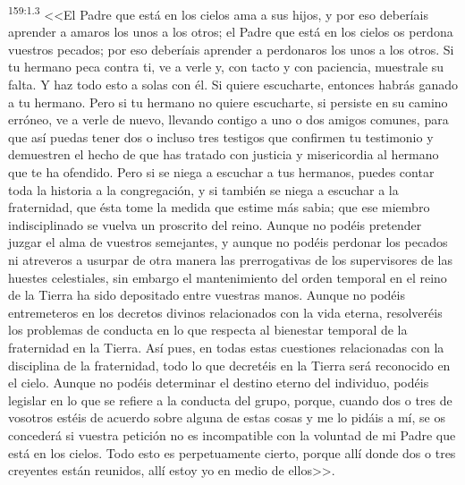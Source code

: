 \par 
\textsuperscript{159:1.3} <<El Padre que está en los cielos ama a sus hijos, y por eso deberíais aprender a amaros los unos a los otros; el Padre que está en los cielos os perdona vuestros pecados; por eso deberíais aprender a perdonaros los unos a los otros. Si tu hermano peca contra ti, ve a verle y, con tacto y con paciencia, muestrale su falta. Y haz todo esto a solas con él. Si quiere escucharte, entonces habrás ganado a tu hermano. Pero si tu hermano no quiere escucharte, si persiste en su camino erróneo, ve a verle de nuevo, llevando contigo a uno o dos amigos comunes, para que así puedas tener dos o incluso tres testigos que confirmen tu testimonio y demuestren el hecho de que has tratado con justicia y misericordia al hermano que te ha ofendido. Pero si se niega a escuchar a tus hermanos, puedes contar toda la historia a la congregación, y si también se niega a escuchar a la fraternidad, que ésta tome la medida que estime más sabia; que ese miembro indisciplinado se vuelva un proscrito del reino. Aunque no podéis pretender juzgar el alma de vuestros semejantes, y aunque no podéis perdonar los pecados ni atreveros a usurpar de otra manera las prerrogativas de los supervisores de las huestes celestiales, sin embargo el mantenimiento del orden temporal en el reino de la Tierra ha sido depositado entre vuestras manos. Aunque no podéis entremeteros en los decretos divinos relacionados con la vida eterna, resolveréis los problemas de conducta en lo que respecta al bienestar temporal de la fraternidad en la Tierra. Así pues, en todas estas cuestiones relacionadas con la disciplina de la fraternidad, todo lo que decretéis en la Tierra será reconocido en el cielo. Aunque no podéis determinar el destino eterno del individuo, podéis legislar en lo que se refiere a la conducta del grupo, porque, cuando dos o tres de vosotros estéis de acuerdo sobre alguna de estas cosas y me lo pidáis a mí, se os concederá si vuestra petición no es incompatible con la voluntad de mi Padre que está en los cielos. Todo esto es perpetuamente cierto, porque allí donde dos o tres creyentes están reunidos, allí estoy yo en medio de ellos>>.

